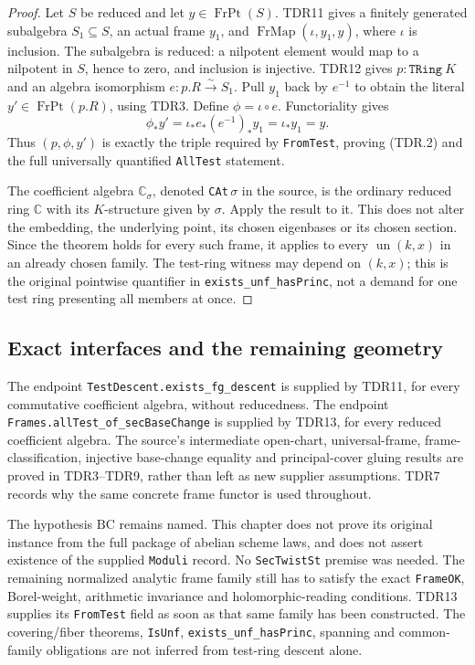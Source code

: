 \begin{proof}
Let \(S\) be reduced and let \(y\in\operatorname{FrPt}(S)\).
TDR11 gives a finitely generated subalgebra \(S_1\subseteq S\),
an actual frame \(y_1\), and
\(\operatorname{FrMap}(\iota,y_1,y)\), where \(\iota\)
is inclusion.  The subalgebra is reduced: a nilpotent element
would map to a nilpotent in \(S\), hence to zero, and inclusion
is injective.  TDR12 gives \(p:\texttt{TRing}\ K\) and
an algebra isomorphism \(e:p.R\xrightarrow{\sim}S_1\).
Pull \(y_1\) back by \(e^{-1}\) to obtain the literal
\(y'\in\operatorname{FrPt}(p.R)\), using TDR3.  Define
\(\phi=\iota\circ e\).  Functoriality gives
\[
 \phi_*y'=\iota_*e_*(e^{-1})_*y_1
         =\iota_*y_1=y.                                    \tag{TDR.12}
\]
Thus \((p,\phi,y')\) is exactly the triple required by
\texttt{FromTest}, proving (TDR.2) and the full universally
quantified \texttt{AllTest} statement.

The coefficient algebra \(\mathbb C_\sigma\), denoted
\texttt{CAt}\(\,\sigma\) in the source, is the ordinary
reduced ring \(\mathbb C\) with its \(K\)-structure given
by \(\sigma\).  Apply the result to it.  This does not alter
the embedding, the underlying point, its chosen eigenbases or
its chosen section.  Since the theorem holds for every such
frame, it applies to every \(\operatorname{un}(k,x)\) in
an already chosen family.  The test-ring witness may depend
on \((k,x)\); this is the original pointwise quantifier in
\texttt{exists\_unf\_hasPrinc}, not a demand for one test
ring presenting all members at once.
\end{proof}

\subsection{Exact interfaces and the remaining geometry}

The endpoint \texttt{TestDescent.exists\_fg\_descent} is supplied
by TDR11, for every commutative coefficient algebra, without
reducedness.  The endpoint
\texttt{Frames.allTest\_of\_secBaseChange} is supplied by TDR13,
for every reduced coefficient algebra.  The source's intermediate
open-chart, universal-frame, frame-classification, injective
base-change equality and principal-cover gluing results are
proved in TDR3--TDR9, rather than left as new supplier assumptions.
TDR7 records why the same concrete frame functor is used throughout.

The hypothesis \(\mathrm{BC}\) remains named.  This chapter does
not prove its original instance from the full package of abelian
scheme laws, and does not assert existence of the supplied
\texttt{Moduli} record.  No \texttt{SecTwistSt} premise was needed.
The remaining normalized analytic frame family still has to
satisfy the exact \texttt{FrameOK}, Borel-weight, arithmetic
invariance and holomorphic-reading conditions.  TDR13 supplies its
\texttt{FromTest} field as soon as that same family has been
constructed.  The covering/fiber theorems, \texttt{IsUnf},
\texttt{exists\_unf\_hasPrinc}, spanning and common-family
obligations are not inferred from test-ring descent alone.

